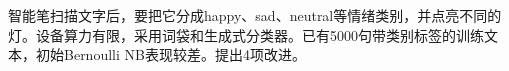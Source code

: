 智能笔扫描文字后，要把它分成happy、sad、neutral等情绪类别，并点亮不同的灯。设备算力有限，采用词袋和生成式分类器。已有5000句带类别标签的训练文本，初始Bernoulli NB表现较差。提出4项改进。
